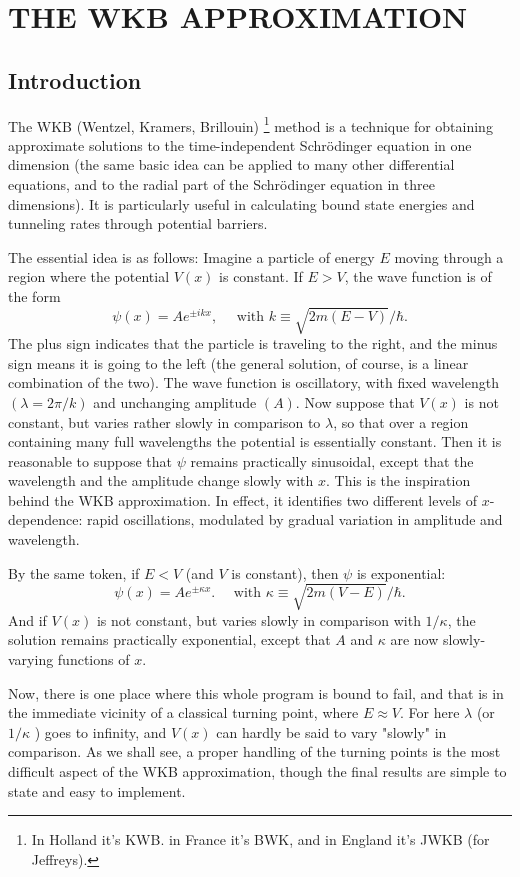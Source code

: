 \documentclass[main.tex]{subfiles}
\begin{document}
\chapter{THE WKB APPROXIMATION}
\section{Introduction}
The WKB (Wentzel, Kramers, Brillouin) \footnote{In Holland it's KWB. in France it's BWK, and in England it's JWKB (for Jeffreys).} method is a technique for obtaining approximate solutions to the time-independent Schrödinger equation in one dimension (the same basic idea can be applied to many other differential equations, and to the radial part of the Schrödinger equation in three dimensions). It is particularly useful in calculating bound state energies and tunneling rates through potential barriers.

The essential idea is as follows: Imagine a particle of energy $E$ moving through a region where the potential $V(x)$ is constant. If $E>V$, the wave function is of the form
$$
\psi(x)=A e^{\pm i k x}, \quad \text { with } k \equiv \sqrt{2 m(E-V)} / \hbar .
$$
The plus sign indicates that the particle is traveling to the right, and the minus sign means it is going to the left (the general solution, of course, is a linear combination of the two). The wave function is oscillatory, with fixed wavelength $(\lambda=2 \pi / k)$ and unchanging amplitude $(A)$. Now suppose that $V(x)$ is not constant, but varies rather slowly in comparison to $\lambda$, so that over a region containing many full wavelengths the potential is essentially constant. Then it is reasonable to suppose that $\psi$ remains practically sinusoidal, except that the wavelength and the amplitude change slowly with $x$. This is the inspiration behind the WKB approximation. In effect, it identifies two different levels of $x$-dependence: rapid oscillations, modulated by gradual variation in amplitude and wavelength.

By the same token, if $E<V$ (and $V$ is constant), then $\psi$ is exponential:
$$
\psi(x)=A e^{\pm \kappa x} . \quad \text { with } \kappa \equiv \sqrt{2 m(V-E)} / \hbar .
$$
And if $V(x)$ is not constant, but varies slowly in comparison with $1 / \kappa$, the solution remains practically exponential, except that $A$ and $\kappa$ are now slowly-varying functions of $x$.

Now, there is one place where this whole program is bound to fail, and that is in the immediate vicinity of a classical turning point, where $E \approx V$. For here $\lambda$ (or $1 / \kappa$ ) goes to infinity, and $V(x)$ can hardly be said to vary "slowly" in comparison. As we shall see, a proper handling of the turning points is the most difficult aspect of the WKB approximation, though the final results are simple to state and easy to implement.
\end{document}
